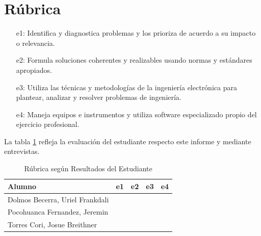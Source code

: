 \documentclass[12pt,oneside,spanish]{article}
\begin{document}
\section*{Rúbrica}
\begin{itemize}
\item[e1:] Identifica y diagnostica problemas y los prioriza de acuerdo a su impacto o relevancia.
\item[e2:] Formula soluciones coherentes y realizables usando normas y estándares apropiados.
\item[e3:] Utiliza las técnicas y metodologías de la ingeniería electrónica para plantear, analizar y resolver problemas de ingeniería.
\item[e4:] Maneja equipos e instrumentos y utiliza software especializado propio del ejercicio profesional.
\end{itemize}
La tabla \ref{tab:rubricas} refleja la evaluación del estudiante respecto este informe y mediante entrevistas. 

\begin{table}[h!]
\caption{Rúbrica según Resultados del Estudiante}
\centering
\begin{tabular}{lcccc}
\hline 
Alumno & e1 & e2 & e3 & e4\tabularnewline
\hline 
\hline 
Dolmos Becerra, Uriel Frankdali &  &  &  & \tabularnewline
\hline 
Pocohuanca Fernandez, Jeremin &  &  &  & \tabularnewline
\hline 
Torres Cori, Josue Breithner &  &  &  & \tabularnewline
\hline
\end{tabular}
\label{tab:rubricas}
\end{table}
\end{document}
